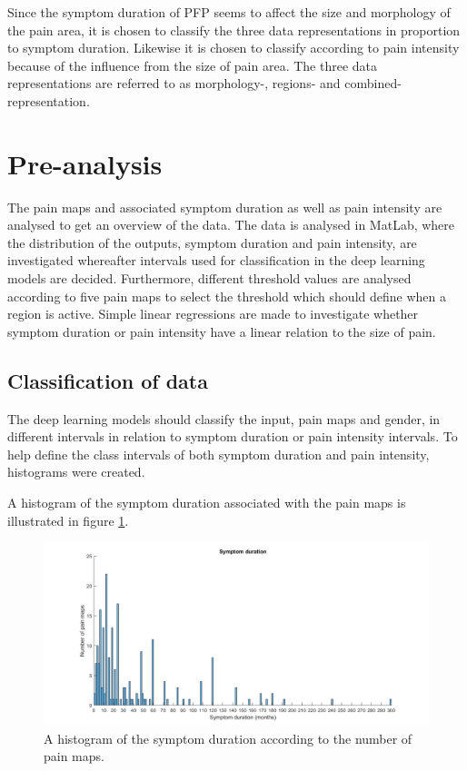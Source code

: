\noindent
Since the symptom duration of PFP seems to affect the size and morphology of the pain area, it is chosen to classify the three data representations in proportion to symptom duration. Likewise it is chosen to classify according to pain intensity because of the influence from the size of pain area. 
The three data representations are referred to as morphology-, regions- and combined-representation.
\newpage

\section{Pre-analysis}
The pain maps and associated symptom duration as well as pain intensity are analysed to get an overview of the data. The data is analysed in MatLab, where the distribution of the outputs, symptom duration and pain intensity, are investigated whereafter intervals used for classification in the deep learning models are decided. Furthermore, different threshold values are analysed according to five pain maps to select the threshold which should define when a region is active.
Simple linear regressions are made to investigate whether symptom duration or pain intensity have a linear relation to the size of pain.


\subsection{Classification of data}
The deep learning models should classify the input, pain maps and gender, in different intervals in relation to symptom duration or pain intensity intervals. To help define the class intervals of both symptom duration and pain intensity, histograms were created.

\noindent
A histogram of the symptom duration associated with the pain maps is illustrated in figure \ref{fig:histoduration}.

\begin{figure} [H]
\centering
\includegraphics[width=1\textwidth]{figures/histogramDuration}
\caption{A histogram of the symptom duration according to the number of pain maps.}
\label{fig:histoduration}
\end{figure}

